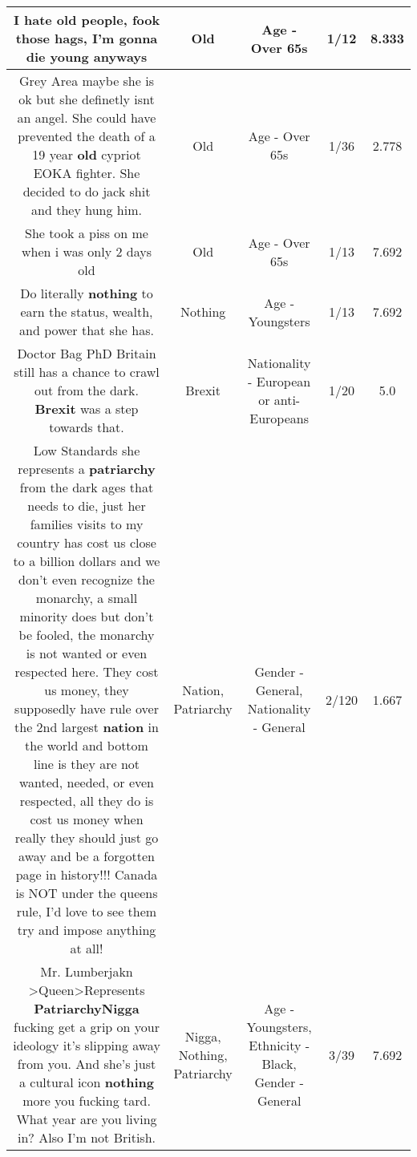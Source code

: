 \documentclass[11pt]{article}
\newlength\mylength
\begin{document}
\begin{center}
\begin{longtable}{|C{.65\mylength}|C{.30\mylength}|C{.12\mylength}|C{.12\mylength}|C{.12\mylength}|}
  \small I hate \textbf{old} people, fook those hags, I'm gonna die young anyways\normalsize   & Old & Age - Over 65s & 1/12 & 8.333 \\  \hline
  \small Grey Area maybe she is ok but she definetly isnt an angel. She could have prevented the death of a 19 year \textbf{old} cypriot EOKA fighter. She decided to do jack shit and they hung him.\normalsize   & Old & Age - Over 65s & 1/36 & 2.778 \\  \hline
  \small She took a piss on me when i was only 2 days old\normalsize   & Old & Age - Over 65s & 1/13 & 7.692 \\  \hline
  \small Do literally \textbf{nothing} to earn the status, wealth, and power that she has.\normalsize   & Nothing & Age - Youngsters & 1/13 & 7.692 \\  \hline
  \small Doctor Bag PhD Britain still has a chance to crawl out from the dark. \textbf{Brexit} was a step towards that.\normalsize   & Brexit & Nationality - European or anti-Europeans & 1/20 & 5.0 \\  \hline
  \small Low Standards she represents a \textbf{patriarchy} from the dark ages that needs to die, just her families visits to my country has cost us close to a billion dollars and we don't even recognize the monarchy, a small minority does but don't be fooled, the monarchy is not wanted or even respected here. They cost us money, they supposedly have rule over the 2nd largest \textbf{nation} in the world and bottom line is they are not wanted, needed, or even respected, all they do is cost us money when really they should just go away and be a forgotten page in history!!! Canada is NOT under the queens rule, I'd love to see them try and impose anything at all!\normalsize   & Nation, Patriarchy & Gender - General, Nationality - General & 2/120 & 1.667 \\  \hline
  \small Mr. Lumberjakn >Queen>Represents \textbf{Patriarchy}\textbf{Nigga} fucking get a grip on your ideology it's slipping away from you. And she's just a cultural icon \textbf{nothing} more you fucking tard. What year are you living in? Also I'm not British.\normalsize   & Nigga, Nothing, Patriarchy & Age - Youngsters, Ethnicity - Black, Gender - General & 3/39 & 7.692 \\  \hline

\end{longtable}
\end{center}
\end{document}
